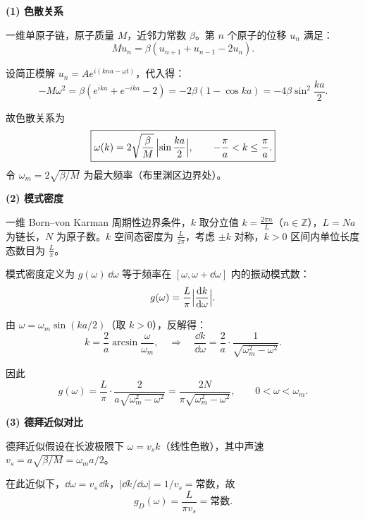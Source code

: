 \begin{derivationbox}[标准解题过程]
\textbf{(1) 色散关系}

一维单原子链，原子质量 $M$，近邻力常数 $\beta$。第 $n$ 个原子的位移 $u_n$ 满足：
\begin{equation}
M\ddot{u}_n=\beta(u_{n+1}+u_{n-1}-2u_n).
\end{equation}

设简正模解 $u_n=Ae^{i(kna-\omega t)}$，代入得：
\begin{equation}
-M\omega^2=\beta(e^{ika}+e^{-ika}-2)=-2\beta(1-\cos ka)=-4\beta\sin^2\frac{ka}{2}.
\end{equation}

故色散关系为
\begin{equation}
\boxed{\omega(k)=2\sqrt{\frac{\beta}{M}}\,\Bigl|\sin\frac{ka}{2}\Bigr|,\qquad -\frac{\pi}{a}<k\le\frac{\pi}{a}.}
\end{equation}
令 $\omega_m=2\sqrt{\beta/M}$ 为最大频率（布里渊区边界处）。

\textbf{(2) 模式密度}

一维 Born--von Karman 周期性边界条件，$k$ 取分立值 $k=\frac{2\pi n}{L}$（$n\in\mathbb{Z}$），$L=Na$ 为链长，$N$ 为原子数。$k$ 空间态密度为 $\frac{L}{2\pi}$，考虑 $\pm k$ 对称，$k>0$ 区间内单位长度态数目为 $\frac{L}{\pi}$。

模式密度定义为 $g(\omega)\,\dd\omega$ 等于频率在 $[\omega,\omega+\dd\omega]$ 内的振动模式数：
\begin{equation}
g(\omega)=\frac{L}{\pi}\Bigl|\frac{\dd k}{\dd\omega}\Bigr|.
\end{equation}

由 $\omega=\omega_m\sin(ka/2)$（取 $k>0$），反解得：
\begin{equation}
k=\frac{2}{a}\arcsin\frac{\omega}{\omega_m},
\quad\Rightarrow\quad
\frac{\dd k}{\dd\omega}=\frac{2}{a}\cdot\frac{1}{\sqrt{\omega_m^2-\omega^2}}.
\end{equation}

因此
\begin{equation}
\boxed{g(\omega)=\frac{L}{\pi}\cdot\frac{2}{a\sqrt{\omega_m^2-\omega^2}}
=\frac{2N}{\pi\sqrt{\omega_m^2-\omega^2}},\qquad 0<\omega<\omega_m.}
\end{equation}

\textbf{(3) 德拜近似对比}

德拜近似假设在长波极限下 $\omega=v_s k$（线性色散），其中声速 $v_s=a\sqrt{\beta/M}=\omega_m a/2$。

在此近似下，$\dd\omega=v_s\,\dd k$，$|\dd k/\dd\omega|=1/v_s=\text{常数}$，故
\begin{equation}
\boxed{g_D(\omega)=\frac{L}{\pi v_s}=\text{常数}.}
\end{equation}


\end{derivationbox}
